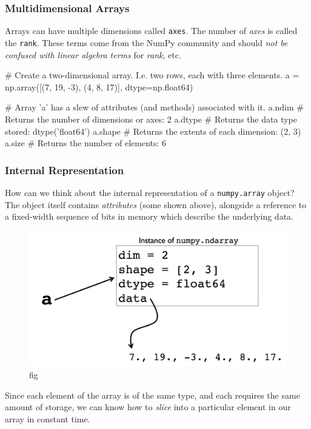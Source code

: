 \documentclass[12pt,letterpaper,twoside]{article}
\begin{document}
\subsubsection{Multidimensional Arrays}
Arrays can have multiple dimensions called \texttt{axes}.
The number of \emph{axes} is called the \texttt{rank}.
These terms come from the NumPy community and should \emph{not be confused
with linear algebra terms} for \emph{rank}, etc.

\begin{python}
# Create a two-dimensional array. I.e. two rows, each with three elements.
a = np.array([(7, 19, -3), (4, 8, 17)], dtype=np.float64)

# Array 'a' has a slew of attributes (and methods) associated with it.
a.ndim      # Returns the number of dimensions or axes: 2
a.dtype     # Returns the data type stored:             dtype('float64')
a.shape     # Returns the extents of each dimension:    (2, 3)
a.size      # Returns the number of elements:           6
\end{python}

\subsubsection{Internal Representation}
How can we think about the internal representation of a
\texttt{numpy.array} object? The object itself contains
\emph{attributes} (some shown above), alongside a reference to a
fixed-width sequence of bits in memory which describe the underlying data.

\begin{figure}[h]
\centering
\includegraphics[scale=0.45]{fig/numpy-representation.png}
\caption{fig}
\end{figure}

Since each element of the array is of the same type, and each requires
the same amount of storage, we can know how to \emph{slice} into a
particular element in our array in constant time.
\end{document}
